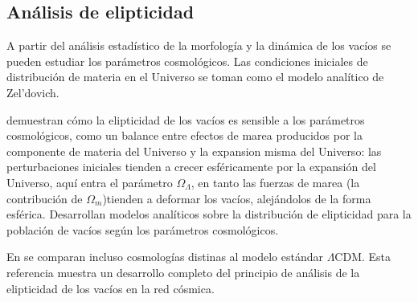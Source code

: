 \documentclass[preprint]{aastex62}
\begin{document}
  \subsection{Análisis de elipticidad}
  
  A partir del análisis estadístico de la morfología y la dinámica de los vacíos se pueden estudiar
  los parámetros cosmológicos. Las condiciones iniciales de distribución de materia en el Universo
  se toman como el modelo analítico de Zel'dovich. 

  \citet{Park-Lee2007}
  demuestran cómo la elipticidad de los vacíos
  es sensible a los parámetros cosmológicos, como un balance entre efectos de marea producidos
  por la componente de materia del Universo y la expansion misma del Universo: las perturbaciones
  iniciales tienden a crecer esféricamente por la expansión del Universo, aquí entra el parámetro
  $\Omega_\Lambda$, en tanto las fuerzas de marea (la contribución de $\Omega_m$)tienden a deformar
  los vacíos, alejándolos de la forma esférica. Desarrollan modelos analíticos sobre la distribución
  de elipticidad para la población de vacíos según los parámetros cosmológicos.

  En \citet{Bos2012} se comparan incluso cosmologías distinas al modelo
  estándar $\Lambda$CDM. Esta referencia muestra un desarrollo completo del principio de análisis de
  la elipticidad de los vacíos en la red cósmica.
\end{document}
